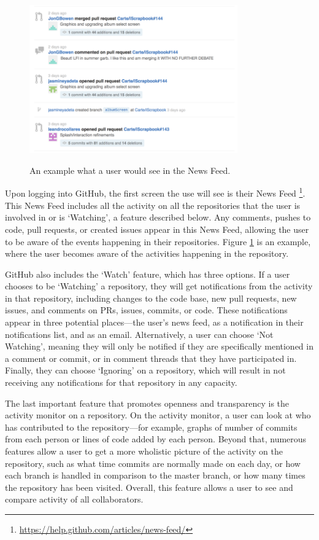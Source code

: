 \begin{figure}[h!]
 \caption{An example what a user would see in the News Feed.}
 \centering
   \includegraphics[width=0.8\textwidth]{newsFeed}
 \label{fig:news_feed}
\end{figure}

Upon logging into GitHub, the first screen the use will see is their News Feed \footnote{\url{https://help.github.com/articles/news-feed/}}. This News Feed includes all the activity on all the repositories that the user is involved in or is `Watching', a feature described below. Any comments, pushes to code, pull requests, or created issues appear in this News Feed, allowing the user to be aware of the events happening in their repositories. Figure \ref{fig:news_feed} is an example, where the user becomes aware of the activities happening in the repository.

GitHub also includes the `Watch' feature, which has three options. If a user chooses to be `Watching' a repository, they will get notifications from the activity in that repository, including changes to the code base, new pull requests, new issues, and comments on PRs, issues, commits, or code. These notifications appear in three potential places---the user's news feed, as a notification in their notifications list, and as an email. Alternatively, a user can choose `Not Watching', meaning they will only be notified if they are specifically mentioned in a comment or commit, or in comment threads that they have participated in. Finally, they can choose `Ignoring' on a repository, which will result in not receiving any notifications for that repository in any capacity.

The last important feature that promotes openness and transparency is the activity monitor on a repository. On the activity monitor, a user can look at who has contributed to the repository---for example, graphs of number of commits from each person or lines of code added by each person. Beyond that, numerous features allow a user to get a more wholistic picture of the activity on the repository, such as what time commits are normally made on each day, or how each branch is handled in comparison to the master branch, or how many times the repository has been visited. Overall, this feature allows a user to see and compare activity of all collaborators.

